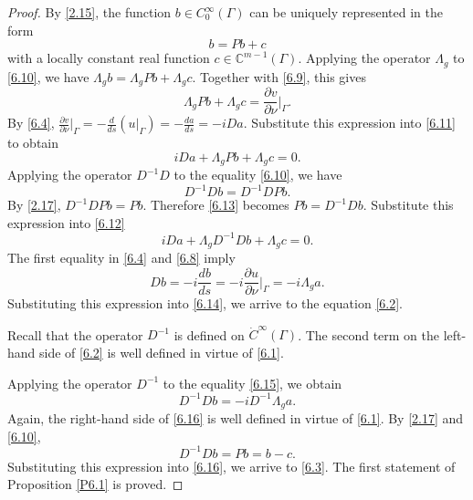 \documentclass[12pt,reqno]{amsart}
\begin{document}
\begin{proof}
By \eqref{2.15}, the function $b\in C^\infty_0(\Gamma)$ can be uniquely represented in the form
\begin{equation}
b=Pb+c
                                \label{6.10}
\end{equation}
with a locally constant real function $c\in{\mathbb C}^{m-1}(\Gamma)$. Applying the operator $\Lambda_g$ to \eqref{6.10}, we have
$
\Lambda_gb=\Lambda_gPb+\Lambda_gc.
$
Together with \eqref{6.9}, this gives
\begin{equation}
\Lambda_gPb+\Lambda_gc=\frac{\partial v}{\partial\nu}\Big|_\Gamma.
                                \label{6.11}
\end{equation}
By \eqref{6.4},
$
\frac{\partial v}{\partial\nu}\Big|_\Gamma=-\frac{d}{ds}(u|_\Gamma)=-\frac{da}{ds}=-iDa.
$
Substitute this expression into \eqref{6.11} to obtain
\begin{equation}
iDa+\Lambda_gPb+\Lambda_gc=0.
                                \label{6.12}
\end{equation}
Applying the operator $D^{-1}D$ to the equality \eqref{6.10}, we have
\begin{equation}
D^{-1}Db=D^{-1}DPb.
                                \label{6.13}
\end{equation}
By \eqref{2.17}, $D^{-1}DPb=Pb$. Therefore \eqref{6.13} becomes $Pb=D^{-1}Db$. Substitute this expression into \eqref{6.12}
\begin{equation}
iDa+\Lambda_gD^{-1}Db+\Lambda_gc=0.
                                \label{6.14}
\end{equation}
The first equality in \eqref{6.4} and \eqref{6.8} imply
\begin{equation}
Db=-i\frac{db}{ds}=-i\frac{\partial u}{\partial\nu}\Big|_\Gamma=-i\Lambda_ga.
                                \label{6.15}
\end{equation}
Substituting this expression into \eqref{6.14}, we arrive to the equation \eqref{6.2}.

Recall that the operator $D^{-1}$ is defined on $\dot C^\infty(\Gamma)$. The second term on the left-hand side of \eqref{6.2} is well defined in virtue of \eqref{6.1}.


Applying the operator $D^{-1}$ to the equality \eqref{6.15}, we obtain
\begin{equation}
D^{-1}Db=-iD^{-1}\Lambda_ga.
                                \label{6.16}
\end{equation}
Again, the right-hand side of \eqref{6.16} is well defined in virtue of \eqref{6.1}.
By \eqref{2.17} and \eqref{6.10},
$$
D^{-1}Db=Pb=b-c.
$$
Substituting this expression into \eqref{6.16}, we arrive to \eqref{6.3}. The first statement of Proposition \ref{P6.1} is proved.


\end{proof}
\end{document}
